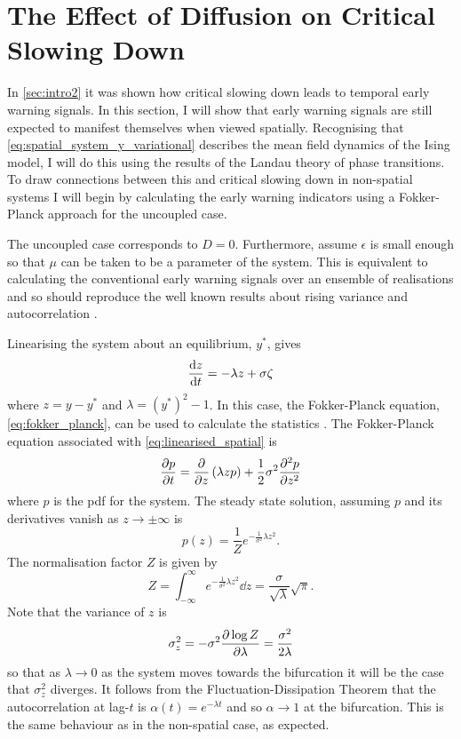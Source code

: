 \section{The Effect of Diffusion on Critical Slowing Down}
\label{sec:spatial_csd}
In \cref{sec:intro2} it was shown how critical slowing down leads to temporal early warning signals. In this section, I will show that early warning signals are still expected
to manifest themselves when viewed spatially. Recognising that \cref{eq:spatial_system_y_variational} describes the mean field dynamics of
the Ising model, I will do this using the results of the Landau theory of phase transitions. To draw connections between this and critical slowing down in non-spatial systems
I will begin by calculating the early warning indicators using a Fokker-Planck approach for the uncoupled case.

The uncoupled case corresponds to  $D = 0$. Furthermore, assume $\epsilon$ is small enough so that $\mu$ can be taken to be a parameter of the system.
This is equivalent to calculating the conventional early warning signals over an ensemble of realisations and so should reproduce the well known results about rising variance
and autocorrelation \parencite{Dakos2008}.

Linearising the system about an equilibrium, $y^*$, gives
\begin{equation}
  \label{eq:linearised_spatial}
  \dv{z}{t} = -\lambda z + \sigma \zeta
\end{equation}
where $z = y - y^*$ and $\lambda = (y^*)^2 - 1$. 
In this case, the Fokker-Planck equation, \cref{eq:fokker_planck}, can be used to calculate the statistics \parencite{Risken1984}.
The Fokker-Planck equation associated with \cref{eq:linearised_spatial} is
\begin{equation}
  \label{eq:fokker_planck_linearised_spatial}
  \pdv{p}{t} = \pdv{z}\left(\lambda z p\right) + \frac{1}{2}\sigma^2 \pdv[2]{p}{z}
\end{equation}
where $p$ is the pdf for the system. The steady state solution, assuming $p$ and its derivatives vanish as $z\rightarrow \pm\infty$ is
\begin{equation}
  \label{eq:solution_to_fokker_planck}
  p(z) = \frac{1}{Z} e^{-\frac{1}{\sigma^2}\lambda z^2}.
\end{equation}
The normalisation factor $Z$ is given by
\begin{equation}
  \label{eq:partition_function}
  Z = \int_{-\infty}^{\infty} e^{-\frac{1}{\sigma^2}\lambda z^2} \dd{z} = \frac{\sigma}{\sqrt{\lambda}} \sqrt{\pi}.
\end{equation}
Note that the variance of $z$ is
\begin{equation}
  \label{eq:var_z}
  \sigma_z^2 = -\sigma^2 \pdv{\log Z}{\lambda} = \frac{\sigma^2}{2\lambda}
\end{equation}
so that as $\lambda \rightarrow 0$ as the system moves towards the bifurcation it will be the case that $\sigma_z^2$ diverges.
It follows from the Fluctuation-Dissipation Theorem \parencite{Marconi2008} that the autocorrelation at lag-$t$ is $\alpha(t) = e^{-\lambda t}$ and so $\alpha \rightarrow 1$ at the bifurcation.
This is the same behaviour as in the non-spatial case, as expected.

